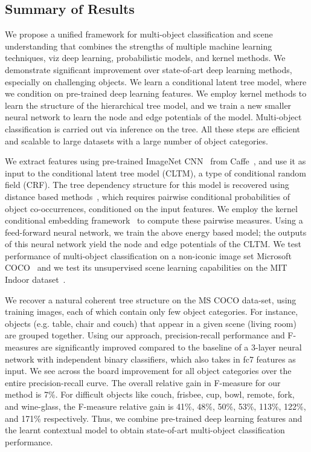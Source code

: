 \documentclass{article}
\begin{document}
\subsection{Summary of Results}

We propose a unified framework for multi-object classification and scene understanding that combines the strengths of multiple machine learning techniques, viz deep learning, probabilistic models, and kernel methods. We demonstrate significant improvement over state-of-art deep learning methods, especially on challenging objects. We learn a conditional latent tree model, where we condition on pre-trained deep learning features. We employ kernel methods to learn the structure of the hierarchical tree model, and we train a new smaller neural network to learn the node and edge potentials of the model. Multi-object classification is carried out via  inference on the tree. All these steps are efficient and scalable to large datasets with a large number of object categories.



We extract features using pre-trained ImageNet CNN~\cite{imagenet} from Caffe~\cite{caffe}, and use it as input to the conditional latent tree model (CLTM), a type of conditional random field (CRF).   The tree dependency structure for this model is recovered using distance based methods~\cite{LTM}, which requires pairwise conditional probabilities of object co-occurrences, conditioned on the input features. We employ the kernel conditional embedding framework~\cite{song} to compute these pairwise measures. Using a feed-forward neural network, we   train the above energy based model; the outputs of this neural network yield the node and edge potentials of the CLTM. We test performance of multi-object classification on a non-iconic image set Microsoft COCO~\cite{MSCOCO} and we test its unsupervised scene learning capabilities on the MIT Indoor dataset~\cite{objectbank}.%





We  recover a natural coherent tree structure on the MS COCO data-set, using training images, each of which contain only few object categories. For instance, objects (e.g. table, chair and couch) that appear in a given scene (living room) are grouped together.
Using our approach, precision-recall performance and F-measures are significantly improved compared to the baseline of a 3-layer neural network with independent binary classifiers, which also takes in fc7 features as input. We see across the board improvement for all object categories  over the entire precision-recall curve. The
overall   relative gain in F-measure for our method is 7\%.   For difficult objects like couch, frisbee, cup, bowl, remote, fork, and wine-glass,  the F-measure relative gain is 41\%,  48\%, 50\%, 53\%,  113\%,  122\%, and 171\% respectively.   Thus, we combine   pre-trained deep learning features and the learnt contextual model to obtain state-of-art multi-object classification performance.
\end{document}
